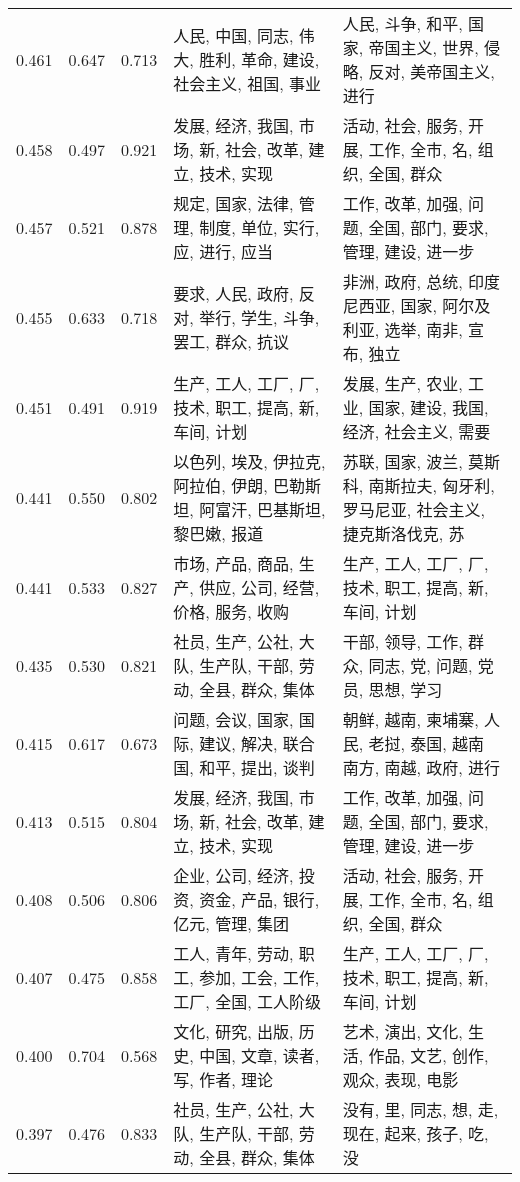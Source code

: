\begin{tabular}{cccp{5cm}p{5cm}}
0.461 & 0.647 & 0.713 & 人民, 中国, 同志, 伟大, 胜利, 革命, 建设, 社会主义, 祖国, 事业 & 人民, 斗争, 和平, 国家, 帝国主义, 世界, 侵略, 反对, 美帝国主义, 进行 \\
0.458 & 0.497 & 0.921 & 发展, 经济, 我国, 市场, 新, 社会, 改革, 建立, 技术, 实现 & 活动, 社会, 服务, 开展, 工作, 全市, 名, 组织, 全国, 群众 \\
0.457 & 0.521 & 0.878 & 规定, 国家, 法律, 管理, 制度, 单位, 实行, 应, 进行, 应当 & 工作, 改革, 加强, 问题, 全国, 部门, 要求, 管理, 建设, 进一步 \\
0.455 & 0.633 & 0.718 & 要求, 人民, 政府, 反对, 举行, 学生, 斗争, 罢工, 群众, 抗议 & 非洲, 政府, 总统, 印度尼西亚, 国家, 阿尔及利亚, 选举, 南非, 宣布, 独立 \\
0.451 & 0.491 & 0.919 & 生产, 工人, 工厂, 厂, 技术, 职工, 提高, 新, 车间, 计划 & 发展, 生产, 农业, 工业, 国家, 建设, 我国, 经济, 社会主义, 需要 \\
0.441 & 0.550 & 0.802 & 以色列, 埃及, 伊拉克, 阿拉伯, 伊朗, 巴勒斯坦, 阿富汗, 巴基斯坦, 黎巴嫩, 报道 & 苏联, 国家, 波兰, 莫斯科, 南斯拉夫, 匈牙利, 罗马尼亚, 社会主义, 捷克斯洛伐克, 苏 \\
0.441 & 0.533 & 0.827 & 市场, 产品, 商品, 生产, 供应, 公司, 经营, 价格, 服务, 收购 & 生产, 工人, 工厂, 厂, 技术, 职工, 提高, 新, 车间, 计划 \\
0.435 & 0.530 & 0.821 & 社员, 生产, 公社, 大队, 生产队, 干部, 劳动, 全县, 群众, 集体 & 干部, 领导, 工作, 群众, 同志, 党, 问题, 党员, 思想, 学习 \\
0.415 & 0.617 & 0.673 & 问题, 会议, 国家, 国际, 建议, 解决, 联合国, 和平, 提出, 谈判 & 朝鲜, 越南, 柬埔寨, 人民, 老挝, 泰国, 越南 南方, 南越, 政府, 进行 \\
0.413 & 0.515 & 0.804 & 发展, 经济, 我国, 市场, 新, 社会, 改革, 建立, 技术, 实现 & 工作, 改革, 加强, 问题, 全国, 部门, 要求, 管理, 建设, 进一步 \\
0.408 & 0.506 & 0.806 & 企业, 公司, 经济, 投资, 资金, 产品, 银行, 亿元, 管理, 集团 & 活动, 社会, 服务, 开展, 工作, 全市, 名, 组织, 全国, 群众 \\
0.407 & 0.475 & 0.858 & 工人, 青年, 劳动, 职工, 参加, 工会, 工作, 工厂, 全国, 工人阶级 & 生产, 工人, 工厂, 厂, 技术, 职工, 提高, 新, 车间, 计划 \\
0.400 & 0.704 & 0.568 & 文化, 研究, 出版, 历史, 中国, 文章, 读者, 写, 作者, 理论 & 艺术, 演出, 文化, 生活, 作品, 文艺, 创作, 观众, 表现, 电影 \\
0.397 & 0.476 & 0.833 & 社员, 生产, 公社, 大队, 生产队, 干部, 劳动, 全县, 群众, 集体 & 没有, 里, 同志, 想, 走, 现在, 起来, 孩子, 吃, 没 \\

\end{tabular}
